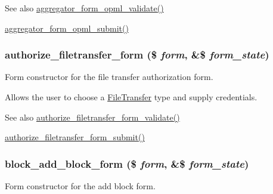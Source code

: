 \begin{DoxySeeAlso}{See also}
\hyperlink{aggregator_8admin_8inc_a62f9c539278bc79a398c545ff7c7ec60}{aggregator\_\-form\_\-opml\_\-validate()} 

\hyperlink{aggregator_8admin_8inc_a6ecc54a12406fb7c756c204966dd00cd}{aggregator\_\-form\_\-opml\_\-submit()} 
\end{DoxySeeAlso}
\hypertarget{group__forms_gac54653dcbe434c2a6519e228874bba30}{
\subsubsection[{authorize\_\-filetransfer\_\-form}]{\setlength{\rightskip}{0pt plus 5cm}authorize\_\-filetransfer\_\-form (\$ {\em form}, \/  \&\$ {\em form\_\-state})}}
\label{group__forms_gac54653dcbe434c2a6519e228874bba30}
Form constructor for the file transfer authorization form.

Allows the user to choose a \hyperlink{classFileTransfer}{FileTransfer} type and supply credentials.

\begin{DoxySeeAlso}{See also}
\hyperlink{authorize_8inc_a06e85bbdcebdfe243002736d6e0e7493}{authorize\_\-filetransfer\_\-form\_\-validate()} 

\hyperlink{authorize_8inc_a228779582880d83c95a9bf56fae2e37c}{authorize\_\-filetransfer\_\-form\_\-submit()} 
\end{DoxySeeAlso}
\hypertarget{group__forms_ga974d0d9820f12e9a2ce5ae328d0ccdc5}{
\subsubsection[{block\_\-add\_\-block\_\-form}]{\setlength{\rightskip}{0pt plus 5cm}block\_\-add\_\-block\_\-form (\$ {\em form}, \/  \&\$ {\em form\_\-state})}}
\label{group__forms_ga974d0d9820f12e9a2ce5ae328d0ccdc5}
Form constructor for the add block form.


